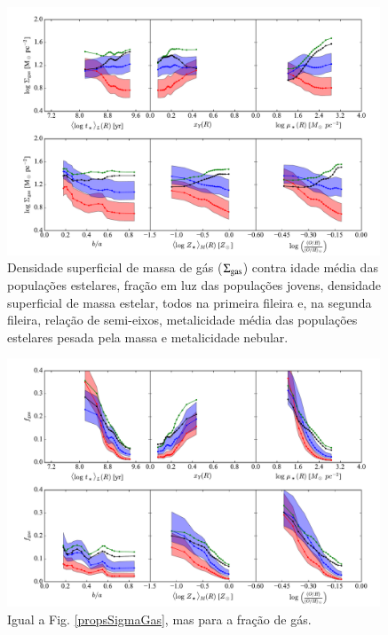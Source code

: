 \begin{figure}
	\centering
	\includegraphics[width=0.99\textwidth]{figuras/props_SigmaGas.pdf}
	\caption[Propriedades físicas e $\SigmaGas$.]
	{Densidade superficial de massa de gás ($\SigmaGas$) contra idade média das populações estelares,
fração em luz das populações jovens, densidade superficial de massa estelar, todos na primeira
fileira e, na segunda fileira, relação de semi-eixos, metalicidade média das populações estelares
pesada pela massa e metalicidade nebular. }
	\label{fig:propsSigmaGas}
\end{figure}
\begin{figure}
	\centering
	\includegraphics[width=0.99\textwidth]{figuras/props_fGas.pdf}
	\caption[Propriedades físicas e $f_{\mathrm{gas}}$.]
	{Igual a Fig. \ref{propsSigmaGas}, mas para a fração de gás.}
	\label{fig:propsfGas}
\end{figure} 

